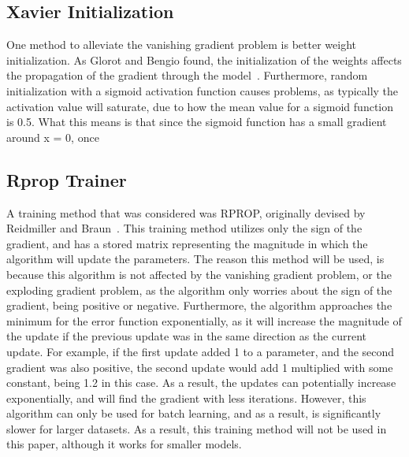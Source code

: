 \documentclass{article}
\begin{document}
\subsection{Xavier Initialization}
One method to alleviate the vanishing gradient problem is better weight
initialization. As Glorot and Bengio found, the initialization of the weights
affects the propagation of the gradient through the model~\cite{xavier}.
Furthermore, random initialization with a sigmoid activation function causes
problems, as typically the activation value will saturate, due to how the mean
value for a sigmoid function is 0.5. What this means is that since the sigmoid
function has a small gradient around x = 0, once

\subsection{Rprop Trainer}
A training method that was considered was RPROP, originally devised by
Reidmiller and Braun~\cite{rprop}. This training method utilizes only the sign
of the gradient, and has a stored matrix representing the magnitude in which the
algorithm will update the parameters. The reason this method will be used, is
because this algorithm is not affected by the vanishing gradient problem, or the
exploding gradient problem, as the algorithm only worries about the sign of the
gradient, being positive or negative. Furthermore, the algorithm approaches the
minimum for the error function exponentially, as it will increase the magnitude
of the update if the previous update was in the same direction as the current
update. For example, if the first update added 1 to a parameter, and the second
gradient was also positive, the second update would add 1 multiplied with some
constant, being 1.2 in this case. As a result, the updates can potentially
increase exponentially, and will find the gradient with less iterations.
However, this algorithm can only be used for batch learning, and as a result, is
significantly slower for larger datasets. As a result, this training method will
not be used in this paper, although it works for smaller models.
\end{document}
